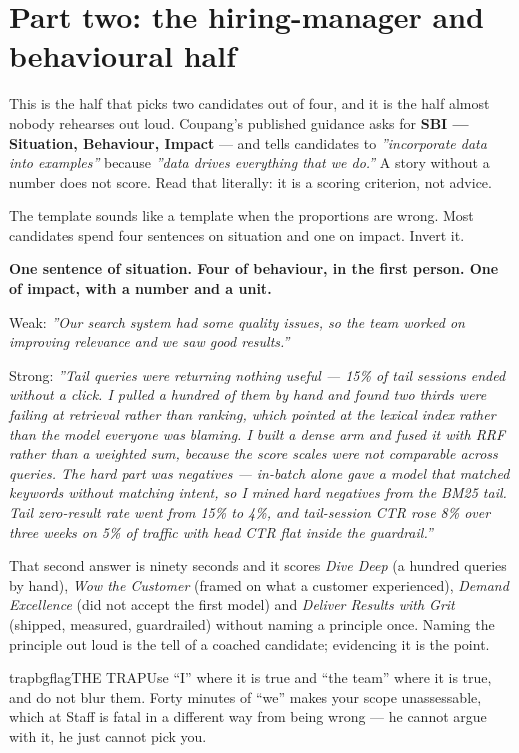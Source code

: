 \documentclass[10pt,twoside]{book}
\makeatletter
\newcommand{\cchapter}[1]{\chapter{#1}}
\newcommand{\csection}[1]{\par\vspace{13pt}\noindent{\sffamily\large\bfseries\color{ink}\raggedright #1\par}\vspace{4pt}}
\newenvironment{callouttrap}{\begin{co@box}{trapbg}{flag}{THE TRAP}}{\end{co@box}}
\makeatother
\begin{document}
\cchapter{Part two: the hiring-manager and behavioural half}
This is the half that picks two candidates out of four, and it is the half almost nobody rehearses out loud. Coupang's published guidance asks for \textbf{SBI --- Situation, Behaviour, Impact} --- and tells candidates to \textit{''incorporate data into examples''} because \textit{''data drives everything that we do.''} A story without a number does not score. Read that literally: it is a scoring criterion, not advice.\par
\csection{SBI at conversational length}
The template sounds like a template when the proportions are wrong. Most candidates spend four sentences on situation and one on impact. Invert it.\par
\textbf{One sentence of situation. Four of behaviour, in the first person. One of impact, with a number and a unit.}\par
Weak: \textit{''Our search system had some quality issues, so the team worked on improving relevance and we saw good results.''}\par
Strong: \textit{''Tail queries were returning nothing useful --- 15\% of tail sessions ended without a click. I pulled a hundred of them by hand and found two thirds were failing at retrieval rather than ranking, which pointed at the lexical index rather than the model everyone was blaming. I built a dense arm and fused it with RRF rather than a weighted sum, because the score scales were not comparable across queries. The hard part was negatives --- in-batch alone gave a model that matched keywords without matching intent, so I mined hard negatives from the BM25 tail. Tail zero-result rate went from 15\% to 4\%, and tail-session CTR rose 8\% over three weeks on 5\% of traffic with head CTR flat inside the guardrail.''}\par
That second answer is ninety seconds and it scores \textit{Dive Deep} (a hundred queries by hand), \textit{Wow the Customer} (framed on what a customer experienced), \textit{Demand Excellence} (did not accept the first model) and \textit{Deliver Results with Grit} (shipped, measured, guardrailed) without naming a principle once. Naming the principle out loud is the tell of a coached candidate; evidencing it is the point.\par
\begin{callouttrap}Use ``I'' where it is true and ``the team'' where it is true, and do not blur them. Forty minutes of ``we'' makes your scope unassessable, which at Staff is fatal in a different way from being wrong --- he cannot argue with it, he just cannot pick you.\end{callouttrap}
\end{document}

